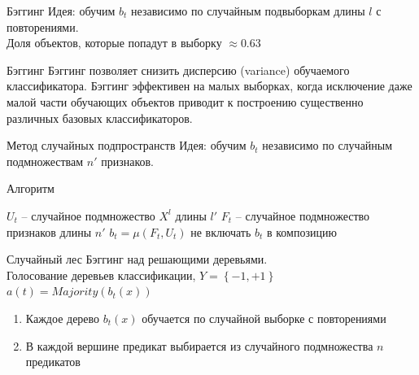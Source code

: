 \documentclass[10pt]{beamer}
\begin{document}
{
\begin{frame}{Бэггинг}
    \alert{Идея}: обучим $b_t$ независимо по случайным подвыборкам длины $l$ с повторениями.\\
    Доля объектов, которые попадут в выборку $\approx 0.63$
\end{frame}
}

\begin{frame}{Бэггинг}
    Бэггинг позволяет снизить дисперсию (variance) обучаемого классификатора. 
    \bigbreak
    \pause
    Бэггинг эффективен на малых выборках, когда исключение даже малой части обучающих объектов приводит к построению существенно различных базовых классификаторов.
\end{frame}

{
\begin{frame}{Метод случайных подпространств}
    \alert{Идея}: обучим $b_t$ независимо по случайным подмножествам $n'$ признаков.\\
\end{frame}
}

\begin{frame}{Алгоритм}
  	\begin{algorithmic}[1]
        \State $U_t$ -- случайное подмножество $X^l$ длины $l'$
        \State $F_t$ -- случайное подмножество признаков длины $n'$
        \State $b_t = \mu (F_t, U_t)$
          \State не включать $b_t$ в композицию
        \EndIf
      \EndFor
    \EndFunction
  \end{algorithmic}
\end{frame}

{
\begin{frame}{Случайный лес}
  Бэггинг над решающими деревьями.\\
  \bigbreak
	Голосование деревьев классификации, $Y = \left\{ -1, +1 \right\}$\\
	$a(t) = Majority(b_t(x))$%
	\begin{enumerate}[--]
  	  \item Каждое дерево $b_t(x)$ обучается по случайной выборке с повторениями
	  \item В каждой вершине предикат выбирается из случайного подмножества $n$ предикатов
	\end{enumerate}
\end{frame}
}
\end{document}
